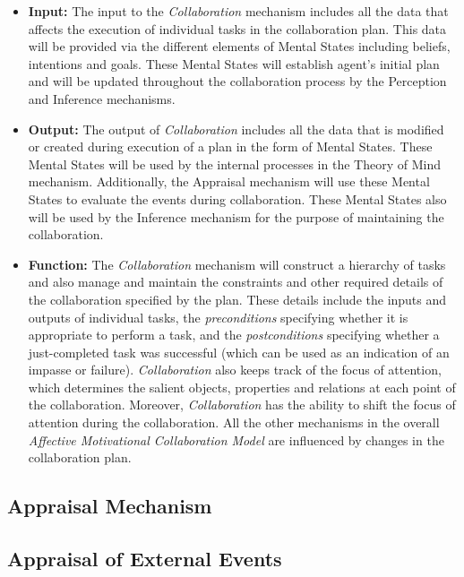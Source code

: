\documentclass[letterpaper]{article}
\begin{document}
\begin{itemize}
  \item \textbf{Input:} The input to the \textit{Collaboration} mechanism
  includes all the data that affects the execution of individual tasks in the
  collaboration plan. This data will be provided via the different elements of
  Mental States including beliefs, intentions and goals. These Mental States
  will establish agent's initial plan and will be updated throughout the
  collaboration process by the Perception and Inference mechanisms.
  
  \item \textbf{Output:} The output of \textit{Collaboration} includes all the
  data that is modified or created during execution of a plan in the form of
  Mental States. These Mental States will be used by the internal processes in
  the Theory of Mind mechanism. Additionally, the Appraisal mechanism will use
  these Mental States to evaluate the events during collaboration. These Mental
  States also will be used by the Inference mechanism for the purpose of
  maintaining the collaboration.
  
  \item \textbf{Function:} The \textit{Collaboration} mechanism will construct a
  hierarchy of tasks and also manage and maintain the constraints and other
  required details of the collaboration specified by the plan. These details
  include the inputs and outputs of individual tasks, the \textit{preconditions}
  specifying whether it is appropriate to perform a task, and the
  \textit{postconditions} specifying whether a just-completed task was
  successful (which can be used as an indication of an impasse or failure).
  \textit{Collaboration} also keeps track of the focus of attention, which
  determines the salient objects, properties and relations at each point of the
  collaboration. Moreover, \textit{Collaboration} has the ability to shift the
  focus of attention during the collaboration. All the other mechanisms in the
  overall \textit{Affective Motivational Collaboration Model} are influenced by
  changes in the collaboration plan.
  
\end{itemize}

\subsection{Appraisal Mechanism}

\subsection{Appraisal of External Events}
\end{document}
